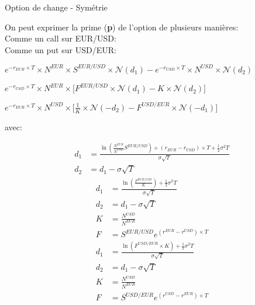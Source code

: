 \documentclass{beamer}
\begin{document}
\begin{frame}{Option de change - Symétrie}
\begin{overprint}
On peut exprimer la prime (\textbf{p}) de l'option de plusieurs manières:\\
Comme un call sur EUR/USD:\\
Comme un put sur USD/EUR:\\
\end{overprint}
\vspace{0.5cm}
\begin{overprint}
\begin{center}
$e^{-r_{EUR} \times T} \times N^{EUR} \times S^{EUR/USD} \times \mathcal{N}(d_1)-e^{-r_{USD} \times T} \times N^{USD} \times \mathcal{N}(d_2)$
\end{center}
\begin{center}
$e^{-r_{USD} \times T} \times N^{EUR} \times \big[ F^{EUR/USD} \times \mathcal{N}(d_1)-K \times \mathcal{N}(d_2) \big]$
\end{center}
\begin{center}
$e^{-r_{EUR} \times T} \times N^{USD} \times \big[ \frac{1}{K} \times \mathcal{N}(-d_2)-F^{USD/EUR} \times \mathcal{N}(-d_1) \big]$
\end{center}
\end{overprint}
avec:\\
\begin{overprint}
\begin{align*}
d_1&=\frac{\ln\left( \frac{N^{EUR}}{N^{USD}} S^{EUR/USD} \right)+(r_{EUR}-r_{USD}) \times T+\frac{1}{2}\sigma^2 T}{\sigma\sqrt{T}}\\
d_2&=d_1-\sigma\sqrt{T}
\end{align*}
\begin{align*}
d_1&=\frac{\ln\left( \frac{F^{EUR/USD}}{K} \right) +\frac{1}{2}\sigma^2 T}{\sigma\sqrt{T}}\\
d_2&=d_1-\sigma\sqrt{T}\\
K&=\frac{N^{USD}}{N^{EUR}}\\
F&=S^{EUR/USD}e^{(r^{EUR}-r^{USD}) \times T}
\end{align*}
\begin{align*}
d_1&=\frac{\ln\left( F^{USD/EUR} \times K \right) +\frac{1}{2}\sigma^2 T}{\sigma\sqrt{T}}\\
d_2&=d_1-\sigma\sqrt{T}\\
K&=\frac{N^{USD}}{N^{EUR}}\\
F&=S^{USD/EUR}e^{(r^{USD}-r^{EUR}) \times T}
\end{align*}
\end{overprint}
\end{frame}
\end{document}
